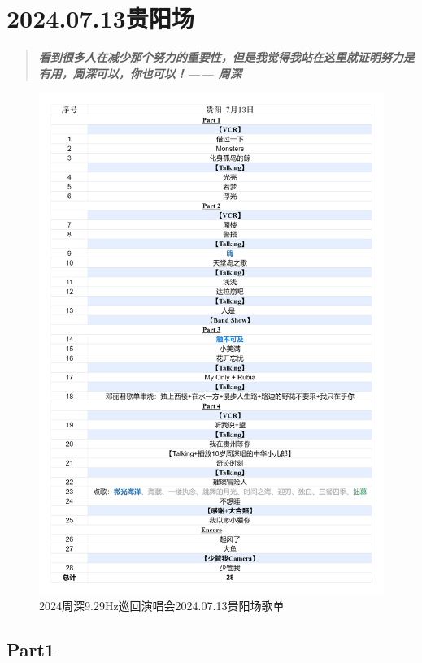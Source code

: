 \documentclass[]{ctexbook}
\begin{document}
\chapter{2024.07.13贵阳场}\label{guiyang-20240713}

\begin{quote}
\textbf{\emph{看到很多人在减少那个努力的重要性，但是我觉得我站在这里就证明努力是有用，周深可以，你也可以！------ 周深}}
\end{quote}

\begin{figure}

{\centering \includegraphics[width=330pt]{img/playlists/playlists-guiyang-20240713} 

}

\caption{2024周深9.29Hz巡回演唱会2024.07.13贵阳场歌单}\label{fig:unnamed-chunk-60}
\end{figure}

\newpage

\section{Part1}\label{guiyang-20240713-part1}
\end{document}
